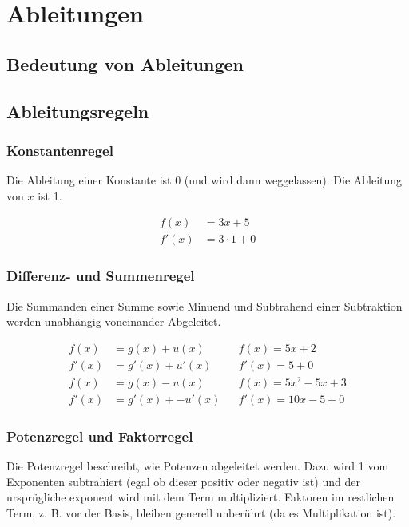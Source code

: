 \section{Ableitungen}

\subsection{Bedeutung von Ableitungen}

\subsection{Ableitungsregeln}

\subsubsection{Konstantenregel}

Die Ableitung einer Konstante ist 0 (und wird dann weggelassen).
Die Ableitung von $x$ ist 1.

\vspace*{-1.3cm}
\begin{align*}
    f(x) & = 3x + 5 \\
    f'(x) & = 3 \cdot 1 + 0
\end{align*}

\subsubsection{Differenz- und Summenregel}

Die Summanden einer Summe sowie Minuend und Subtrahend einer Subtraktion
werden unabhängig voneinander Abgeleitet.

\vspace*{-1.3cm}
\begin{align*}
    f(x) & = g(x) + u(x) & & f(x) = 5x + 2 \\
    f'(x) & = g'(x) + u'(x) & & f'(x) = 5 + 0\\
    f(x) & = g(x) - u(x) & & f(x) = 5x^2 - 5x + 3 \\
    f'(x) & = g'(x) +- u'(x) & & f'(x) = 10x - 5 + 0
\end{align*}

\subsubsection{Potenzregel und Faktorregel}

Die Potenzregel beschreibt, wie Potenzen abgeleitet werden. Dazu wird 1 vom
Exponenten subtrahiert (egal ob dieser positiv oder negativ ist) und der ursprügliche
exponent wird mit dem Term multipliziert. Faktoren im restlichen Term, z. B.
vor der Basis, bleiben generell unberührt (da es Multiplikation ist).

